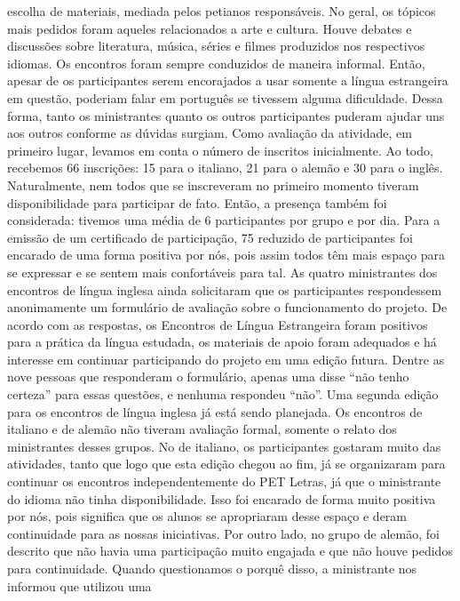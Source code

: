 escolha de materiais, mediada pelos petianos responsáveis.
No geral, os tópicos mais pedidos foram aqueles relacionados a arte e cultura. Houve debates
e discussões sobre literatura, música, séries e filmes produzidos nos respectivos idiomas. Os
encontros foram sempre conduzidos de maneira informal. Então, apesar de os participantes
serem encorajados a usar somente a língua estrangeira em questão, poderiam falar em português
se tivessem alguma dificuldade. Dessa forma, tanto os ministrantes quanto os outros
participantes puderam ajudar uns aos outros conforme as dúvidas surgiam.
Como avaliação da atividade, em primeiro lugar, levamos em conta o número de inscritos
inicialmente. Ao todo, recebemos 66 inscrições: 15 para o italiano, 21 para o alemão e 30 para o
inglês. Naturalmente, nem todos que se inscreveram no primeiro momento tiveram
disponibilidade para participar de fato. Então, a presença também foi considerada: tivemos uma
média de 6 participantes por grupo e por dia. Para a emissão de um certificado de participação,
75%
reduzido de participantes foi encarado de uma forma positiva por nós, pois assim todos têm mais
espaço para se expressar e se sentem mais confortáveis para tal.
As quatro ministrantes dos encontros de língua inglesa ainda solicitaram que os participantes
respondessem anonimamente um formulário de avaliação sobre o funcionamento do projeto. De
acordo com as respostas, os Encontros de Língua Estrangeira foram positivos para a prática da
língua estudada, os materiais de apoio foram adequados e há interesse em continuar participando
do projeto em uma edição futura. Dentre as nove pessoas que responderam o formulário, apenas
uma disse “não tenho certeza” para essas questões, e nenhuma respondeu “não”. Uma segunda
edição para os encontros de língua inglesa já está sendo planejada.
Os encontros de italiano e de alemão não tiveram avaliação formal, somente o relato dos
ministrantes desses grupos. No de italiano, os participantes gostaram muito das atividades, tanto
que logo que esta edição chegou ao fim, já se organizaram para continuar os encontros
independentemente do PET Letras, já que o ministrante do idioma não tinha disponibilidade. Isso
foi encarado de forma muito positiva por nós, pois significa que os alunos se apropriaram desse
espaço e deram continuidade para as nossas iniciativas. Por outro lado, no grupo de alemão, foi
descrito que não havia uma participação muito engajada e que não houve pedidos para
continuidade. Quando questionamos o porquê disso, a ministrante nos informou que utilizou uma
